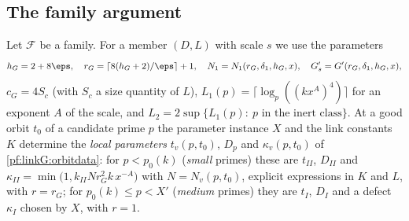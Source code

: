\subsection{The family argument}\label{sec:pf:linkG:family}

Let $\mathcal F$ be a family. For a member $(D,L)$ with scale $s$ we use the parameters
\[
h_G=2+8\eps,\quad r_G=\lceil8(h_G+2)/\eps\rceil+1,\quad N_1=N_1(r_G,\delta_1,h_G,x),\quad G'_s=G'(r_G,\delta_1,h_G,x),
\]
$c_G=4S_c$ (with $S_c$ a size quantity of $L$), $L_1(p)=\lceil\log_p((kx^A)^4)\rceil$ for an exponent $A$ of the
scale, and $L_2=2\sup\{L_1(p):\ p\text{ in the inert class}\}$. At a good orbit $t_0$ of a candidate prime $p$ the
parameter instance $X$ and the link constants $K$ determine the \emph{local parameters} $t_v(p,t_0)$, $D_p$ and
$\kappa_v(p,t_0)$ of \cref{pf:linkG:orbitdata}: for $p<p_0(k)$ (\emph{small} primes) these are $t_{II}$, $D_{II}$ and
$\kappa_{II}=\min\bigl(1,k_{II}Nr_G^2k\,x^{-A}\bigr)$ with $N=N_v(p,t_0)$, explicit expressions in $K$ and $L$, with
$r=r_G$; for
$p_0(k)\le p<X'$ (\emph{medium} primes) they are $t_I$, $D_I$ and a defect $\kappa_I$ chosen by $X$, with $r=1$.

